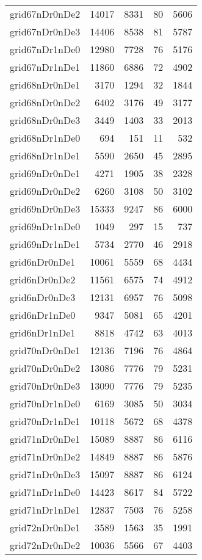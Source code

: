 \begin{longtable}{lrrrr}
grid67nDr0nDe2 & 14017 & 8331 & 80 & 5606 \\
grid67nDr0nDe3 & 14406 & 8538 & 81 & 5787 \\
grid67nDr1nDe0 & 12980 & 7728 & 76 & 5176 \\
grid67nDr1nDe1 & 11860 & 6886 & 72 & 4902 \\
grid68nDr0nDe1 & 3170 & 1294 & 32 & 1844 \\
grid68nDr0nDe2 & 6402 & 3176 & 49 & 3177 \\
grid68nDr0nDe3 & 3449 & 1403 & 33 & 2013 \\
grid68nDr1nDe0 & 694 & 151 & 11 & 532 \\
grid68nDr1nDe1 & 5590 & 2650 & 45 & 2895 \\
grid69nDr0nDe1 & 4271 & 1905 & 38 & 2328 \\
grid69nDr0nDe2 & 6260 & 3108 & 50 & 3102 \\
grid69nDr0nDe3 & 15333 & 9247 & 86 & 6000 \\
grid69nDr1nDe0 & 1049 & 297 & 15 & 737 \\
grid69nDr1nDe1 & 5734 & 2770 & 46 & 2918 \\
grid6nDr0nDe1 & 10061 & 5559 & 68 & 4434 \\
grid6nDr0nDe2 & 11561 & 6575 & 74 & 4912 \\
grid6nDr0nDe3 & 12131 & 6957 & 76 & 5098 \\
grid6nDr1nDe0 & 9347 & 5081 & 65 & 4201 \\
grid6nDr1nDe1 & 8818 & 4742 & 63 & 4013 \\
grid70nDr0nDe1 & 12136 & 7196 & 76 & 4864 \\
grid70nDr0nDe2 & 13086 & 7776 & 79 & 5231 \\
grid70nDr0nDe3 & 13090 & 7776 & 79 & 5235 \\
grid70nDr1nDe0 & 6169 & 3085 & 50 & 3034 \\
grid70nDr1nDe1 & 10118 & 5672 & 68 & 4378 \\
grid71nDr0nDe1 & 15089 & 8887 & 86 & 6116 \\
grid71nDr0nDe2 & 14849 & 8887 & 86 & 5876 \\
grid71nDr0nDe3 & 15097 & 8887 & 86 & 6124 \\
grid71nDr1nDe0 & 14423 & 8617 & 84 & 5722 \\
grid71nDr1nDe1 & 12837 & 7503 & 76 & 5258 \\
grid72nDr0nDe1 & 3589 & 1563 & 35 & 1991 \\
grid72nDr0nDe2 & 10036 & 5566 & 67 & 4403 \\

\end{longtable}
